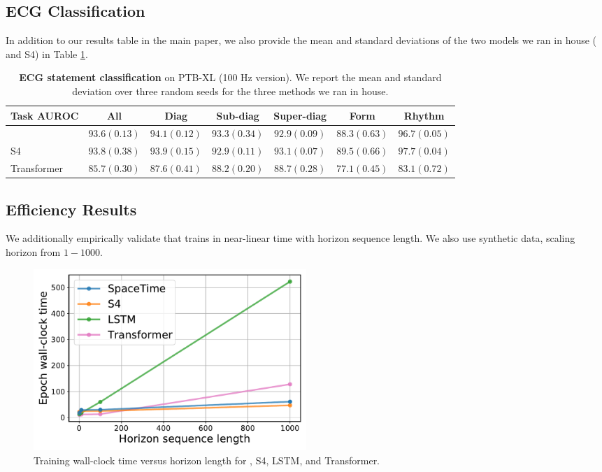 \subsection{ECG Classification}\label{appendix:ecg_results}

In addition to our results table in the main paper, we also provide the mean and standard deviations of the two models we ran in house (\ourmethod{} and S4) in Table \ref{tab:ecg_stats}.

\begin{table}[H]
    \centering
    \caption{ \textbf{ECG statement classification} on PTB-XL (100 Hz version). We report the mean and standard deviation over three random seeds for the three methods we ran in house.}
    \label{tab:ecg_stats}
    \begin{tabular}{@{}lcccccc@{}}
\toprule
Task AUROC & All            & Diag           & Sub-diag       & Super-diag     & Form           & Rhythm         \\ \midrule
\ourmethod{}            & $93.6 (0.13)$   & $94.1 (0.12)$ & $93.3(0.34)$ & $92.9 (0.09)$ & $88.3(0.63)$          & $96.7 (0.05)$    \\
S4    & $93.8 (0.38)$ & $93.9 (0.15)$  & $92.9 (0.11)$ & $93.1 (0.07)$    & $89.5 (0.66)$  & $97.7 (0.04)$ \\
Transformer    & $85.7 (0.30)$ & $87.6 (0.41)$  & $88.2 (0.20)$ & $88.7 (0.28)$    & $77.1 (0.45)$  & $83.1 (0.72)$ \\
\bottomrule
\end{tabular}
    
\end{table}


\subsection{Efficiency Results}

We additionally empirically validate that \ourmethod{} trains in near-linear time with horizon sequence length. We also use synthetic data, scaling horizon from $1 - 1000$. 

\begin{figure}[H]
  \centering
    \includegraphics[width=0.5\textwidth]{_ICLR2023_paper/figures/speed_benchmark_horizon.pdf}
  \caption{Training wall-clock time versus horizon length for \ourmethod{}, S4, LSTM, and Transformer. }
  \label{fig:horizon_efficiency} 
\end{figure}


